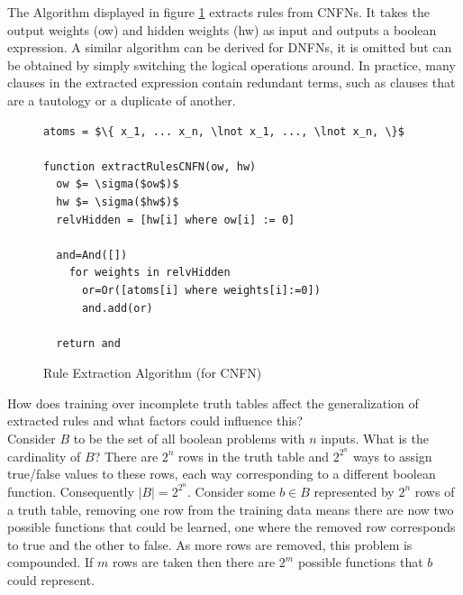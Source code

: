 \noindent
\begin{minipage}[t]{0.3\textwidth}
\vspace{0px}
The Algorithm displayed in figure \ref{alg:rule-extraction} extracts rules from CNFNs. It takes the output weights (ow) and hidden weights (hw) as input and outputs a boolean expression. A similar algorithm can be derived for DNFNs, it is omitted but can be obtained by simply switching the logical operations around. In practice, many clauses in the extracted expression contain redundant terms, such as clauses that are a tautology or a duplicate of another.\\
\end{minipage}
\hspace{0.05\textwidth}
\begin{minipage}[t]{0.65\textwidth}
\vspace{0px}
\begin{figure}[H]
	\begin{lstlisting}[mathescape=true]
atoms = $\{ x_1, ... x_n, \lnot x_1, ..., \lnot x_n, \}$
	
function extractRulesCNFN(ow, hw)
  ow $= \sigma($ow$)$
  hw $= \sigma($hw$)$
  relvHidden = [hw[i] where ow[i] := 0]

  and=And([])
    for weights in relvHidden
      or=Or([atoms[i] where weights[i]:=0])
      and.add(or)
		
  return and
	\end{lstlisting}
	\caption{Rule Extraction Algorithm (for CNFN)}
	\label{alg:rule-extraction}
\end{figure}
\end{minipage}

How does training over incomplete truth tables affect the generalization of extracted rules and what factors could influence this?\\

Consider $B$ to be the set of all boolean problems with $n$ inputs. What is the cardinality of $B$? There are $2^n$ rows in the truth table and $2^{2^n}$ ways to assign true/false values to these rows, each way corresponding to a different boolean function. Consequently $|B| = 2^{2^n}$. Consider some $b \in B$ represented by $2^n$ rows of a truth table, removing one row from the training data means there are now two possible functions that could be learned, one where the removed row corresponds to true and the other to false. As more rows are removed, this problem is compounded. If $m$ rows are taken then there are $2^m$ possible functions that $b$ could represent.\\

